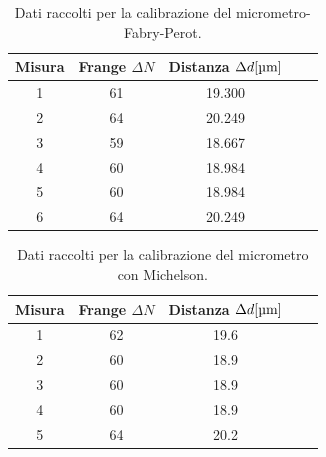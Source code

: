 \documentclass[letterpaper,12pt]{article}
\begin{document}
\begin{table}[h!]
    \centering
    \begin{tabular}{|c|c|c|c|c|}
    \hline
    \textbf{Misura} & \textbf{Frange $\Delta N$} & \textbf{Distanza $\Delta d[\text{\SIUnitSymbolMicro m}]$}  \\
    \hline
    1 & 61 & 19.300 \\
    2 & 64 & 20.249 \\
    3 & 59 & 18.667 \\
    4 & 60 & 18.984 \\
    5 & 60 & 18.984 \\
    6 & 64 & 20.249 \\
    \hline
    \end{tabular}
    \caption{Dati raccolti per la calibrazione del micrometro-Fabry-Perot.}
    \label{tab:calibrazione_micrometro}
\end{table}

\begin{table}[h!]
    \centering
    \begin{tabular}{|c|c|c|c|c|}
    \hline
    \textbf{Misura} & \textbf{Frange $\Delta N$} & \textbf{Distanza $\Delta d [\text{\SIUnitSymbolMicro m}]$}  \\
    \hline
    1 & 62 & 19.6 \\
    2 & 60 & 18.9 \\
    3 & 60 & 18.9 \\
    4 & 60 & 18.9 \\
    5 & 64 & 20.2 \\
    \hline
    \end{tabular}
    \caption{Dati raccolti per la calibrazione del micrometro con Michelson.}
    \label{tab:calibrazione_micrometro_michelson}
\end{table}
\end{document}
